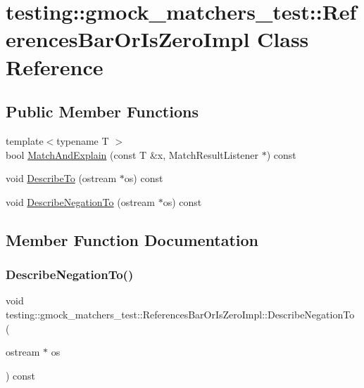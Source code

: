 \hypertarget{classtesting_1_1gmock__matchers__test_1_1ReferencesBarOrIsZeroImpl}{}\section{testing\+::gmock\+\_\+matchers\+\_\+test\+::References\+Bar\+Or\+Is\+Zero\+Impl Class Reference}
\label{classtesting_1_1gmock__matchers__test_1_1ReferencesBarOrIsZeroImpl}
\subsection*{Public Member Functions}
\begin{DoxyCompactItemize}
\item 
{\footnotesize template$<$typename T $>$ }\\bool \mbox{\hyperlink{classtesting_1_1gmock__matchers__test_1_1ReferencesBarOrIsZeroImpl_ac74ff2f707bebea05a995beb77c77041}{Match\+And\+Explain}} (const T \&x, Match\+Result\+Listener $\ast$) const
\item 
void \mbox{\hyperlink{classtesting_1_1gmock__matchers__test_1_1ReferencesBarOrIsZeroImpl_a8d8496ad72753723598efd45e6a4dcbf}{Describe\+To}} (ostream $\ast$os) const
\item 
void \mbox{\hyperlink{classtesting_1_1gmock__matchers__test_1_1ReferencesBarOrIsZeroImpl_a849b65d96bf7a31b7b0e81005e466605}{Describe\+Negation\+To}} (ostream $\ast$os) const
\end{DoxyCompactItemize}


\subsection{Member Function Documentation}
\mbox{\label{classtesting_1_1gmock__matchers__test_1_1ReferencesBarOrIsZeroImpl_a849b65d96bf7a31b7b0e81005e466605}} 
\subsubsection{\texorpdfstring{DescribeNegationTo()}{DescribeNegationTo()}}
{\footnotesize\ttfamily void testing\+::gmock\+\_\+matchers\+\_\+test\+::\+References\+Bar\+Or\+Is\+Zero\+Impl\+::\+Describe\+Negation\+To (\begin{DoxyParamCaption}\item[{ostream $\ast$}]{os }\end{DoxyParamCaption}) const\hspace{0.3cm}{\ttfamily [inline]}}


